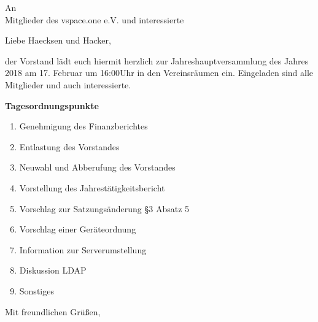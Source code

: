 \documentclass[a4paper]{scrlttr2}
\begin{document}
\begin{letter}{ An \\ Mitglieder des vspace.one e.V. und interessierte  }
\opening{Liebe Haecksen und Hacker,}

der Vorstand lädt euch hiermit herzlich zur Jahreshauptversammlung des Jahres 2018 am 
17. Februar um 16:00Uhr in den Vereinsräumen ein.
Eingeladen sind alle Mitglieder und auch interessierte.

\medskip

\textbf{Tagesordnungspunkte} 
\begin{enumerate}
    \item Genehmigung des Finanzberichtes
    \item Entlastung des Vorstandes
    \item Neuwahl und Abberufung des Vorstandes
    \item Vorstellung des Jahrestätigkeitsbericht
    \item Vorschlag zur Satzungsänderung §3 Absatz 5
    \item Vorschlag einer Geräteordnung
    \item Information zur Serverumstellung
    \item Diskussion LDAP
    \item Sonstiges
\end{enumerate}

\bigskip

\closing{Mit freundlichen Grüßen,}

\end{letter}
\end{document}
